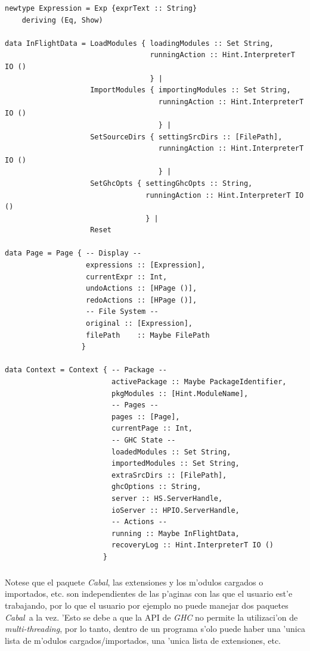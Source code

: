 \documentclass[a4paper]{article}
\newcommand{\cabal}{\textsl{Cabal}}
\begin{document}
\begin{center}\begin{lstlisting}
newtype Expression = Exp {exprText :: String}       
    deriving (Eq, Show)

data InFlightData = LoadModules { loadingModules :: Set String,
                                  runningAction :: Hint.InterpreterT IO ()
                                  } |
                    ImportModules { importingModules :: Set String,
                                    runningAction :: Hint.InterpreterT IO ()
                                    } | 
                    SetSourceDirs { settingSrcDirs :: [FilePath],
                                    runningAction :: Hint.InterpreterT IO ()
                                    } |
                    SetGhcOpts { settingGhcOpts :: String,
                                 runningAction :: Hint.InterpreterT IO ()
                                 } |
                    Reset

data Page = Page { -- Display --
                   expressions :: [Expression],
                   currentExpr :: Int,
                   undoActions :: [HPage ()],
                   redoActions :: [HPage ()],
                   -- File System --
                   original :: [Expression],
                   filePath    :: Maybe FilePath
                  }
                  
data Context = Context { -- Package --
                         activePackage :: Maybe PackageIdentifier,
                         pkgModules :: [Hint.ModuleName],
                         -- Pages --
                         pages :: [Page],
                         currentPage :: Int,
                         -- GHC State --
                         loadedModules :: Set String,
                         importedModules :: Set String,
                         extraSrcDirs :: [FilePath],
                         ghcOptions :: String,
                         server :: HS.ServerHandle,
                         ioServer :: HPIO.ServerHandle,
                         -- Actions --
                         running :: Maybe InFlightData,
                         recoveryLog :: Hint.InterpreterT IO ()
                       }
\end{lstlisting}\end{center}
\subparagraph{}Notese que el paquete \cabal, las extensiones y los m'odulos cargados o importados, etc. son independientes de las p'aginas con las que el usuario est'e trabajando, por lo que el usuario por ejemplo no puede manejar dos paquetes \cabal\ a la vez.  'Esto se debe a que la API de \textsl{GHC} no permite la utilizaci'on de \textsl{multi-threading}, por lo tanto, dentro de un programa s'olo puede haber una 'unica lista de m'odulos cargados/importados, una 'unica lista de extensiones, etc.
\end{document}
